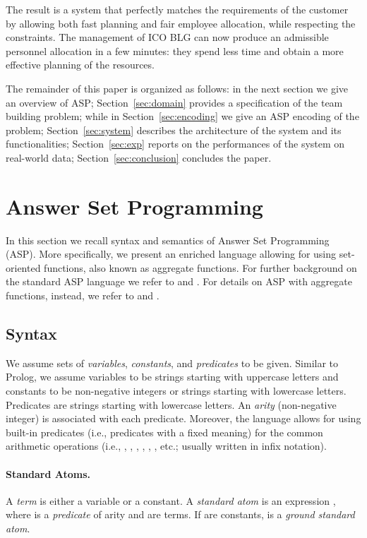 \documentclass{tlp}
\begin{document}
The result is a system that perfectly matches the requirements of the customer by allowing
both fast planning and fair employee allocation, while respecting the constraints.
The management of ICO BLG can now produce an admissible personnel allocation
in a few minutes: they spend less time and obtain a more effective
planning of the resources.

\medskip

The remainder of this paper is organized as follows: in the next section we give an overview of ASP;
Section~\ref{sec:domain} provides a specification of the team building problem;
while in Section~\ref{sec:encoding} we give an ASP encoding of the problem;
Section~\ref{sec:system} describes the architecture of the system and its functionalities;
Section~\ref{sec:exp} reports on the performances of the system on real-world data;
Section~\ref{sec:conclusion} concludes the paper.


\section{Answer Set Programming}\label{sec:language}

In this section we recall syntax and semantics of Answer Set Programming (ASP).
More specifically, we present an enriched language allowing for using set-oriented functions, also known as aggregate functions.
For further background on the standard ASP language we refer to  and .
For details on ASP with aggregate functions, instead, we refer to  and .


\subsection{Syntax}

We assume sets of \emph{variables}, \emph{constants}, and \emph{predicates} to be given.
Similar to Prolog, we assume variables to be strings starting with uppercase letters and constants to be non-negative integers or strings starting with lowercase letters.
Predicates are strings starting with lowercase letters.
An \emph{arity} (non-negative integer) is associated with each predicate.
Moreover, the language allows for using built-in predicates (i.e., predicates with a fixed meaning) for the common arithmetic operations (i.e., , , , , , , etc.; usually written in infix notation).


\paragraph{Standard Atoms.}
A {\em term} is either a variable or a constant.
A {\em standard atom} is an expression , where  is a {\em predicate} of arity  and  are terms.
If  are constants,  is a {\em ground standard atom}.
\end{document}
